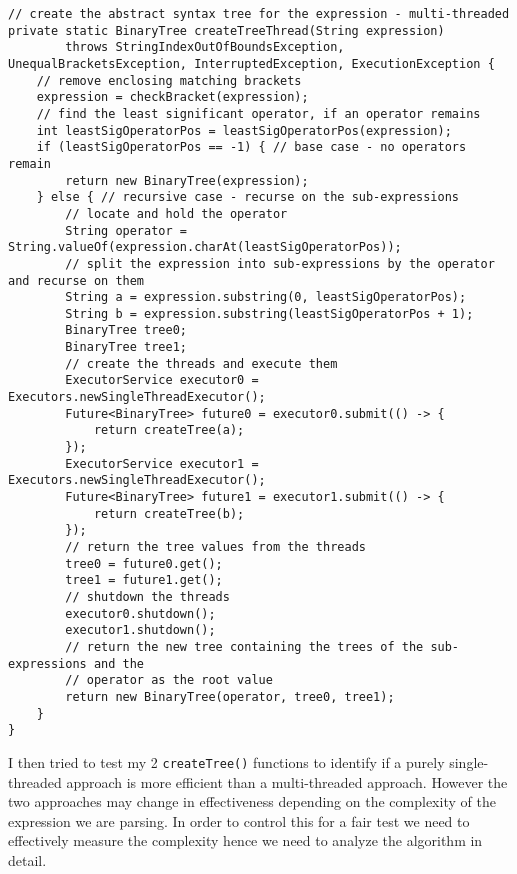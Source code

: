 \documentclass[../../../../../main.tex]{subfiles}
\begin{document}
\begin{verbatim}
// create the abstract syntax tree for the expression - multi-threaded
private static BinaryTree createTreeThread(String expression)
		throws StringIndexOutOfBoundsException, UnequalBracketsException, InterruptedException, ExecutionException {
	// remove enclosing matching brackets
	expression = checkBracket(expression);
	// find the least significant operator, if an operator remains
	int leastSigOperatorPos = leastSigOperatorPos(expression);
	if (leastSigOperatorPos == -1) { // base case - no operators remain
		return new BinaryTree(expression);
	} else { // recursive case - recurse on the sub-expressions
		// locate and hold the operator
		String operator = String.valueOf(expression.charAt(leastSigOperatorPos));
		// split the expression into sub-expressions by the operator and recurse on them
		String a = expression.substring(0, leastSigOperatorPos);
		String b = expression.substring(leastSigOperatorPos + 1);
		BinaryTree tree0;
		BinaryTree tree1;
		// create the threads and execute them
		ExecutorService executor0 = Executors.newSingleThreadExecutor();
		Future<BinaryTree> future0 = executor0.submit(() -> {
			return createTree(a);
		});
		ExecutorService executor1 = Executors.newSingleThreadExecutor();
		Future<BinaryTree> future1 = executor1.submit(() -> {
			return createTree(b);
		});
		// return the tree values from the threads
		tree0 = future0.get();
		tree1 = future1.get();
		// shutdown the threads
		executor0.shutdown();
		executor1.shutdown();
		// return the new tree containing the trees of the sub-expressions and the
		// operator as the root value
		return new BinaryTree(operator, tree0, tree1);
	}
}
\end{verbatim}
\newpage\noindent
I then tried to test my 2 \texttt{createTree()} functions to identify if a purely single-threaded approach is more efficient than a multi-threaded approach. However the two approaches may change in effectiveness depending on the complexity of the expression we are parsing. In order to control this for a fair test we need to effectively measure the complexity hence we need to analyze the algorithm in detail.
\end{document}
